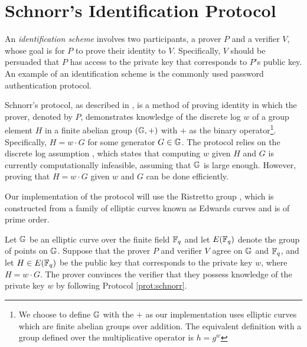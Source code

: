 \section{Schnorr's Identification Protocol}\label{sec:schnorr}
An \textit{identification scheme} involves two participants, a prover $P$ and a verifier $V$, whose goal is for $P$ to prove their identity to $V$. Specifically, $V$ should be persuaded that $P$ has access to the private key that corresponds to $P$'s public key. An example of an identification scheme is the commonly used password authentication protocol.

Schnorr's protocol, as described in \cite{Schnorr}, is a method of proving identity in which the prover, denoted by $P$, demonstrates knowledge of the discrete log $w$ of a group element $H$ in a finite abelian group $(\mathbb{G}, +)$ with $+$ as the binary operator\footnote{We choose to define $\mathbb{G}$ with the $+$ as our implementation uses elliptic curves which are finite abelian groups over addition. The equivalent definition with a group defined over the multiplicative operator is $h = g^w$}. Specifically, $H = w \cdot G$ for some generator $G \in \mathbb{G}$. The protocol relies on the discrete log assumption \cite{Diffie1976NewDI}, which states that computing $w$ given $H$ and $G$ is currently computationally infeasible, assuming that $\mathbb{G}$ is large enough. However, proving that $H = w \cdot G$ given $w$ and $G$ can be done efficiently. 

Our implementation of the protocol will use the Ristretto group \cite{ristretto_web}, which is constructed from a family of elliptic curves known as Edwards curves \cite{Edwards2007} and is of prime order. 

\begin{definition}\label{def:schnorr}
    Let $\mathbb{G}$ be an elliptic curve over the finite field $\mathbb{F}_q$ and let $E(\mathbb{F}_q)$ denote the group of points on $\mathbb{G}$. Suppose that the prover $P$ and verifier $V$ agree on $\mathbb{G}$ and $\mathbb{F}_q$, and let $H \in E(\mathbb{F}_q)$ be the public key that corresponds to the private key $w$, where $H = w \cdot G$. The prover convinces the verifier that they possess knowledge of the private key $w$ by following Protocol \ref{prot:schnorr}.
\end{definition}

